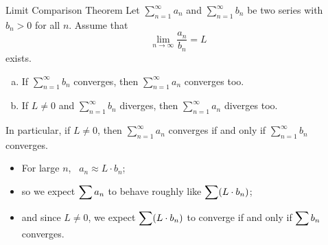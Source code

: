 \begin{frame}[t]
\begin{block}{Limit Comparison Theorem}
Let $\sum_{n=1}^\infty a_n$ and $\sum_{n=1}^\infty b_n$ be two series with
$b_n>0$ for all $n$. Assume that
\begin{equation*}
\lim_{n\rightarrow\infty}\frac{a_n}{b_n}=L
\end{equation*}
exists.
\begin{enumerate}[(a)]
\item If $\sum_{n=1}^\infty b_n$  converges, then
$\sum_{n=1}^\infty a_n$ converges too.

\item If $L\ne 0$ and $\sum_{n=1}^\infty b_n$  diverges,
then $\sum_{n=1}^\infty a_n$ diverges too.
\end{enumerate}

In particular, \alert<2->{if $L\ne 0$, then $\sum_{n=1}^\infty a_n$ converges
if and only if $\sum_{n=1}^\infty b_n$ converges.}
\end{block}\pause\pause
\begin{itemize}[<+->]
\item For large $n$,~ $a_n \approx L\cdot b_n$;
\item so we expect $\displaystyle\sum a_n$ to behave roughly like $\displaystyle\sum( L \cdot b_n)$;
\item and since $L \neq 0$, we expect $\displaystyle\sum (L \cdot b_n)$ to converge if and only if
$\displaystyle\sum b_n$ converges.
\end{itemize}
\end{frame}


